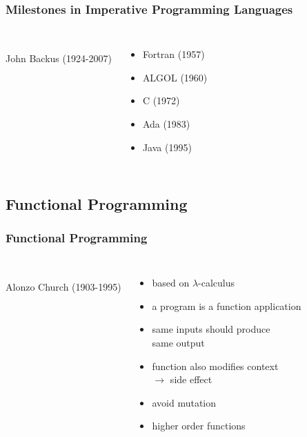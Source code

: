 \documentclass[dvipsnames]{beamer}
\theoremstyle{plain}
\begin{document}
\begin{frame}
  \frametitle{Milestones in Imperative Programming Languages}

  \begin{columns}
    \begin{center}
      \\
      John Backus (1924-2007)
    \end{center}

    \begin{itemize}
      \item Fortran (1957)
      \item ALGOL (1960)
      \item C (1972)
      \item Ada (1983)
      \item Java (1995)
    \end{itemize}
  \end{columns}
\end{frame}

\subsection{Functional Programming}

\begin{frame}
  \frametitle{Functional Programming}

  \begin{columns}
    \begin{center}
      \\
      Alonzo Church (1903-1995)
    \end{center}

    \begin{itemize}
      \item based on $\lambda$-calculus
      \item a program is a function application
      \item same inputs should produce\\
        same output
      \item function also modifies context\\
        $\rightarrow$ \alert{side effect}
      \item avoid mutation
      \item higher order functions
    \end{itemize}
  \end{columns}
\end{frame}
\end{document}
